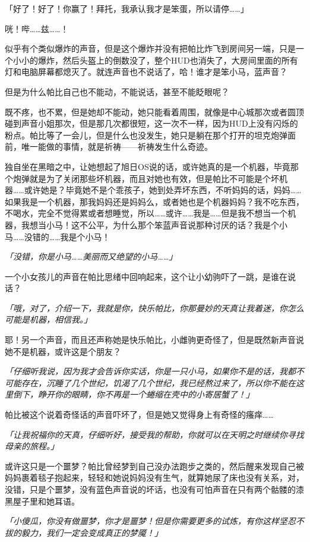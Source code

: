「好了！好了！你赢了！拜托，我承认我才是笨蛋，所以请停……」

咣！哔……兹……！

似乎有个类似爆炸的声音，但是这个爆炸并没有把帕比炸飞到房间另一端，只是一个小小的爆炸，然后头盔上的倒数没了，整个HUD也消失了，大房间里面的所有灯和电脑屏幕都熄灭了。就连声音也不说话了，哈！谁才是笨小马，蓝声音？

但是为什么帕比自己也不能动，不能说话，甚至不能眨眼呢？

既不疼，也不累，但是她却不能动，她只能看着周围，就像是中心城那次或者圆顶碰到声音小姐那次，但是那几次都很短，这一次不一样，因为HUD上没有闪烁的粉点。帕比等了一会儿，但是什么也没发生，她只是躺在那个打开的坦克炮弹面前，唯一能做的事情，就是祈祷——祈祷发生什么奇迹。

独自坐在黑暗之中，让她想起了旭日OS说的话，或许她真的是一个机器，毕竟那个炮弹就是为了关闭那些坏机器，而且对她也有效，但是帕比不可能是个坏机器……或许她是？毕竟她不是个乖孩子，她到处弄坏东西，不听妈妈的话，妈妈……如果我是一个机器，那我妈妈还是妈妈么，或者她也是个机器妈妈？我不吃东西，不喝水，完全不觉得累或者想睡觉，所以……或许……我是……但是我不想当一个机器，我想当小马！这不公平，为什么那个笨蓝声音说那种讨厌的话？我是个小马……没错的……我是个小马！

\emph{「没错，你是小马……美丽而又绝望的小马……」}

一个小女孩儿的声音在帕比思绪中回响起来，这个让小幼驹吓了一跳，是谁在说话？

\emph{「哦，对了，介绍一下，我就是你，快乐帕比，你那曼妙的天真让我着迷，你怎么可能是机器，相信我。」}

耶！另一个声音，而且还声称她是快乐帕比，小雌驹更奇怪了，但是既然新声音说她不是机器，或许这是个朋友？

\emph{「仔细听我说，因为我才会告诉你实话，你是一只小马，如果你不是的话，我都不可能存在，沉睡了几个世纪，饥渴了几个世纪，我已经熬过来了，所以你不能在这里倒下，睁开你的眼睛，你不再是一个蜷缩在壳中的小寄居蟹了！」}

帕比被这个说着奇怪话的声音吓坏了，但是她又觉得身上有奇怪的瘙痒……{}

\emph{「让我祝福你的天真，仔细听好，接受我的帮助，你就可以在天明之时继续你寻找母亲的旅程。」}

或许这只是一个噩梦？帕比曾经梦到自己没办法跑步之类的，然后醒来发现自己被妈妈裹着毯子抱起来，轻轻和她说妈妈没有生气，就算她尿了床也没有关系，对，没错，只是个噩梦，没有蓝色声音说的坏话，也没有可怕声音在只有两个骷髅的漆黑屋子里和她耳语。

\emph{「小傻瓜，你没有做噩梦，你才是噩梦！但是你需要更多的试炼，有你这样坚忍不拔的毅力，我们一定会变成真正的梦魇！」}

